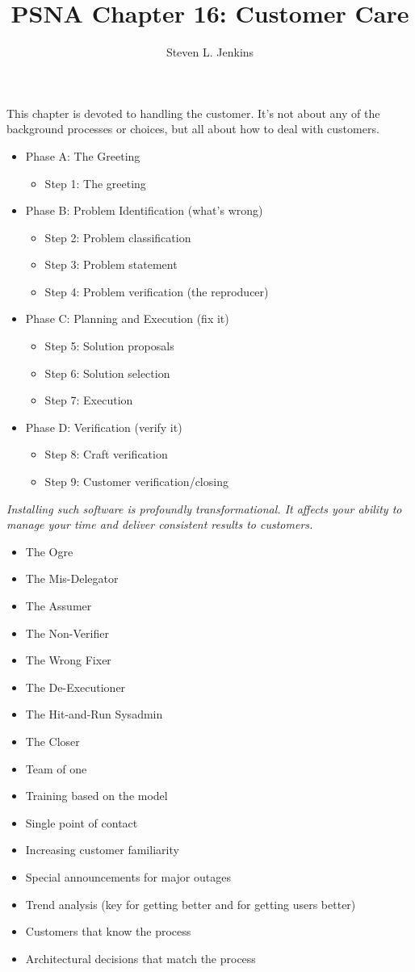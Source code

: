 \documentclass{slides}
\title{PSNA Chapter 16: Customer Care}
\author{Steven L. Jenkins}
\newcommand{\bi}{\begin{itemize}}
\newcommand{\ei}{\end{itemize}}
\begin{document}

This chapter is devoted to handling the customer.  It's not
about any of the background processes or choices, but all about how
to deal with customers.


\bi
\item Phase A: The Greeting
  \bi
  \item Step 1: The greeting
  \ei
\item Phase B: Problem Identification (what's wrong)
  \bi
  \item Step 2: Problem classification
  \item Step 3: Problem statement
  \item Step 4: Problem verification (the reproducer)
  \ei
\item Phase C: Planning and Execution (fix it)
  \bi
  \item Step 5: Solution proposals
  \item Step 6: Solution selection
  \item Step 7: Execution
  \ei
\ei


\bi
\item Phase D: Verification (verify it)
  \bi
  \item Step 8: Craft verification
  \item Step 9: Customer verification/closing
  \ei
\ei


\emph{Installing such software is profoundly transformational.  It
affects your ability to manage your time and deliver consistent results
to customers.}


\bi
\item The Ogre
\item The Mis-Delegator
\item The Assumer
\item The Non-Verifier
\item The Wrong Fixer
\item The De-Executioner
\item The Hit-and-Run Sysadmin
\item The Closer
\ei


\bi
\item Team of one
\item Training based on the model
\item Single point of contact
\item Increasing customer familiarity
\item Special announcements for major outages
\item Trend analysis (key for getting better and for getting users
  better)
\item Customers that know the process
\item Architectural decisions that match the process
\ei
\end{document}
